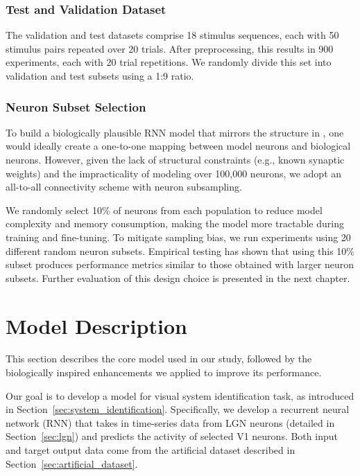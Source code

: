 \subsubsection{Test and Validation Dataset}
\label{subsubsec:test_dataset}

The validation and test datasets comprise 18 stimulus sequences, each with 50 stimulus pairs repeated over 20 trials. After preprocessing, this results in 900 experiments, each with 20 trial repetitions. We randomly divide this set into validation and test subsets using a 1:9 ratio.

\subsubsection{Neuron Subset Selection}
\label{subsubsec:subset_selection}

To build a biologically plausible RNN model that mirrors the structure in \citet{antolik2024comprehensive}, one would ideally create a one-to-one mapping between model neurons and biological neurons. However, given the lack of structural constraints (e.g., known synaptic weights) and the impracticality of modeling over 100,000 neurons, we adopt an all-to-all connectivity scheme with neuron subsampling.

We randomly select 10\% of neurons from each population to reduce model complexity and memory consumption, making the model more tractable during training and fine-tuning. To mitigate sampling bias, we run experiments using 20 different random neuron subsets. Empirical testing has shown that using this 10\% subset produces performance metrics similar to those obtained with larger neuron subsets. Further evaluation of this design choice is presented in the next chapter.

\section{Model Description}
\label{sec:model_description}

This section describes the core model used in our study, followed by the biologically inspired enhancements we applied to improve its performance.

Our goal is to develop a model for visual system identification task, as introduced in Section~\ref{sec:system_identification}. Specifically, we develop a recurrent neural network (RNN) that takes in time-series data from LGN neurons (detailed in Section~\ref{sec:lgn}) and predicts the activity of selected V1 neurons. Both input and target output data come from the artificial dataset described in Section~\ref{sec:artificial_dataset}.

